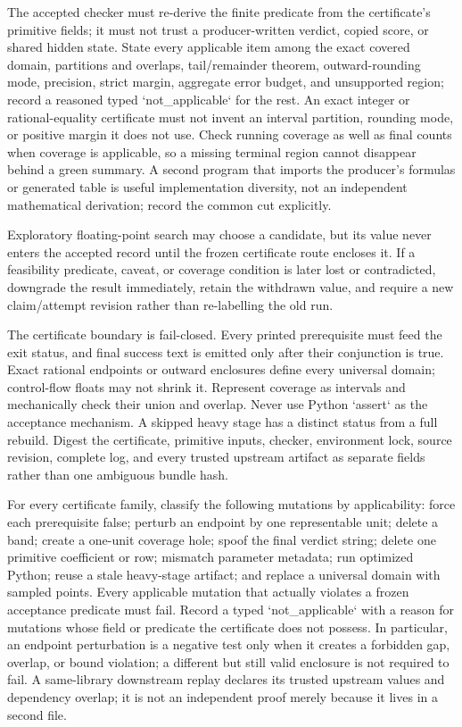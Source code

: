 \documentclass[11pt]{article}
\begin{document}
\begin{markdown}
The accepted checker must re-derive the finite predicate from the certificate's primitive fields;
it must not trust a producer-written verdict, copied score, or shared hidden state. State every
applicable item among the exact covered domain, partitions and overlaps, tail/remainder theorem,
outward-rounding mode, precision, strict margin, aggregate error budget, and unsupported region;
record a reasoned typed `not_applicable` for the rest. An exact integer or rational-equality
certificate must not invent an interval partition, rounding mode, or positive margin it does not
use. Check running coverage as well as final counts when coverage is applicable, so a missing
terminal region cannot disappear behind a green summary. A second
program that imports the producer's formulas or generated table is useful implementation diversity,
not an independent mathematical derivation; record the common cut explicitly.

Exploratory floating-point search may choose a candidate, but its value never enters the accepted
record until the frozen certificate route encloses it. If a feasibility predicate, caveat, or
coverage condition is later lost or contradicted, downgrade the result immediately, retain the
withdrawn value, and require a new claim/attempt revision rather than re-labelling the old run.

The certificate boundary is fail-closed. Every printed prerequisite must feed the exit status, and
final success text is emitted only after their conjunction is true. Exact rational endpoints or
outward enclosures define every universal domain; control-flow floats may not shrink it. Represent
coverage as intervals and mechanically check their union and overlap. Never use Python `assert` as
the acceptance mechanism. A skipped heavy stage has a distinct status from a full rebuild. Digest
the certificate, primitive inputs, checker, environment lock, source revision, complete log, and
every trusted upstream artifact as separate fields rather than one ambiguous bundle hash.

For every certificate family, classify the following mutations by applicability: force each
prerequisite false; perturb an endpoint by one representable unit; delete a band; create a one-unit
coverage hole; spoof the final verdict string; delete one primitive coefficient or row; mismatch
parameter metadata; run optimized Python; reuse a stale heavy-stage artifact; and replace a
universal domain with sampled points. Every applicable mutation that actually violates a frozen
acceptance predicate must fail. Record a typed `not_applicable` with a reason for mutations whose
field or predicate the certificate does not possess. In particular, an endpoint perturbation is a
negative test only when it creates a forbidden gap, overlap, or bound violation; a different but
still valid enclosure is not required to fail. A same-library downstream replay declares its
trusted upstream values and dependency overlap; it is not an independent proof merely because it
lives in a second file.


\end{markdown}
\end{document}
